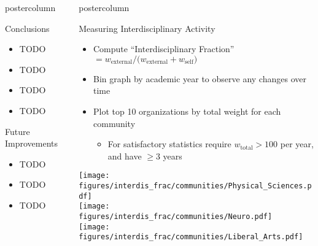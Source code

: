 \documentclass{beamer}
\newcommand{\figures}{../outputs/plots}
\newlength{\columnheight}
\begin{document}
\begin{frame}
\begin{columns}
\begin{column}{.57\textwidth}
\begin{beamercolorbox}[center]{postercolumn}
\begin{minipage}{.98\textwidth}
{  \begin{myblock}{Conclusions}
    \begin{itemize}
      \item TODO
      \item TODO
      \item TODO
      \item TODO
    \end{itemize}
  \end{myblock}\vfill


  \begin{myblock}{Future Improvements}
    \begin{itemize}
      \item TODO
      \item TODO
      \item TODO
    \end{itemize}
  \end{myblock}\vfill


}\end{minipage}\end{beamercolorbox}
\end{column}

\begin{column}{.43\textwidth}
\begin{beamercolorbox}[center]{postercolumn}
\begin{minipage}{.98\textwidth}
\parbox[t][\columnheight]{\textwidth}{
  \vfill
  \begin{myblock}{Measuring Interdisciplinary Activity}
    \begin{itemize}
      \item Compute ``Interdisciplinary Fraction'' $= w_{\text{external}} / \big(w_{\text{external}} + w_{\text{self}}\big)$
      \item Bin graph by academic year to observe any changes over time
      \item Plot top 10 organizations by total weight for each community
      \begin{itemize}
        \item For satisfactory statistics require $w_{\text{total}} > 100$ per year, and have $\geq 3$ years 
      \end{itemize}
    \end{itemize}
    \vspace{0.8cm}
    \begin{center}
      \texttt{[image: \\figures/interdis\_frac/communities/Physical\_Sciences.pdf]}\\
      \texttt{[image: \\figures/interdis\_frac/communities/Neuro.pdf]}\\
      \texttt{[image: \\figures/interdis\_frac/communities/Liberal\_Arts.pdf]}
    \end{center}
  \end{myblock}\vfill


}
\end{minipage}
\end{beamercolorbox}
\end{column}
\end{columns}
\end{frame}
\end{document}
